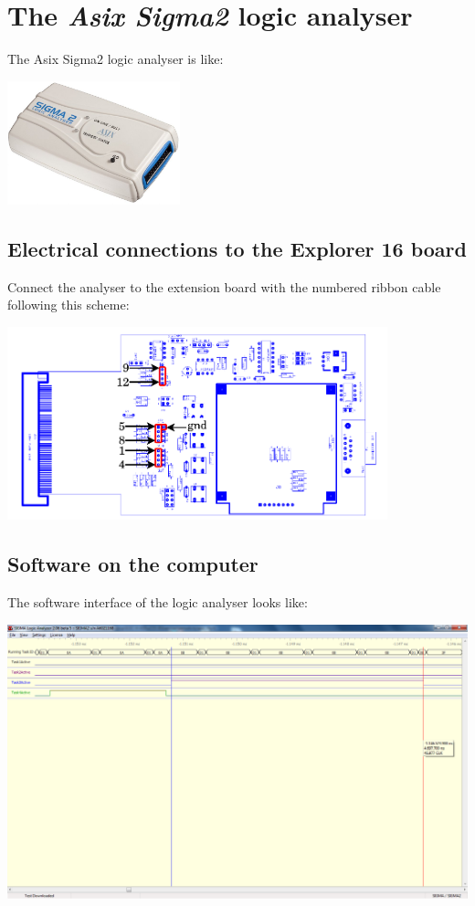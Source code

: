 \documentclass[10pt,a4paper]{article}
\theoremstyle{definition}%
\begin{document}
\newpage
\appendix
\section{The \textit{Asix Sigma2} logic analyser}
The Asix Sigma2 logic analyser is like:\\ 
\label{ap:la}
\begin{center}
\includegraphics[width=5cm]{sigma2_720x515.jpg}
\end{center}
\subsection{Electrical connections to the Explorer 16 board}
Connect the analyser to the extension board with the numbered ribbon cable following this scheme:
\begin{center}
\includegraphics[width=11cm]{elec_con-crop.pdf}
\end{center}
\subsection{Software on the computer}

The software interface of the logic analyser looks like:

\begin{center}
\includegraphics[width=16cm,trim= 0 100mm 0 0,clip]{Print_Screen_Logic_Analyzer.png}

\end{center}
\end{document}
